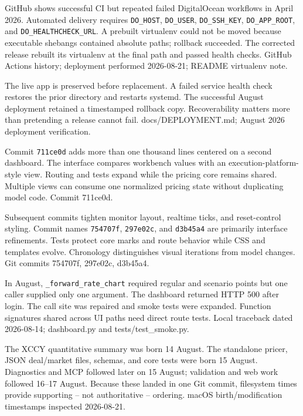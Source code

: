 {GitHub shows successful CI but repeated failed DigitalOcean workflows in April 2026.}
{Automated delivery requires \texttt{DO\_HOST}, \texttt{DO\_USER}, \texttt{DO\_SSH\_KEY}, \texttt{DO\_APP\_ROOT}, and \texttt{DO\_HEALTHCHECK\_URL}.}
{A prebuilt virtualenv could not be moved because executable shebangs contained absolute paths; rollback succeeded.}
{The corrected release rebuilt its virtualenv at the final path and passed health checks.}
{GitHub Actions history; deployment performed 2026-08-21; README virtualenv note.}

{The live app is preserved before replacement.}
{A failed service health check restores the prior directory and restarts systemd.}
{The successful August deployment retained a timestamped rollback copy.}
{Recoverability matters more than pretending a release cannot fail.}
{docs/DEPLOYMENT.md; August 2026 deployment verification.}

{Commit \texttt{711ce0d} adds more than one thousand lines centered on a second dashboard.}
{The interface compares workbench values with an execution-platform-style view.}
{Routing and tests expand while the pricing core remains shared.}
{Multiple views can consume one normalized pricing state without duplicating model code.}
{Commit 711ce0d.}

{Subsequent commits tighten monitor layout, realtime ticks, and reset-control styling.}
{Commit names \texttt{754707f}, \texttt{297e02c}, and \texttt{d3b45a4} are primarily interface refinements.}
{Tests protect core marks and route behavior while CSS and templates evolve.}
{Chronology distinguishes visual iterations from model changes.}
{Git commits 754707f, 297e02c, d3b45a4.}

{In August, \texttt{\_forward\_rate\_chart} required regular and scenario points but one caller supplied only one argument.}
{The dashboard returned HTTP 500 after login.}
{The call site was repaired and smoke tests were expanded.}
{Function signatures shared across UI paths need direct route tests.}
{Local traceback dated 2026-08-14; dashboard.py and tests/test\_smoke.py.}

{The XCCY quantitative summary was born 14 August.}
{The standalone pricer, JSON deal/market files, schemas, and core tests were born 15 August.}
{Diagnostics and MCP followed later on 15 August; validation and web work followed 16--17 August.}
{Because these landed in one Git commit, filesystem times provide supporting -- not authoritative -- ordering.}
{macOS birth/modification timestamps inspected 2026-08-21.}

